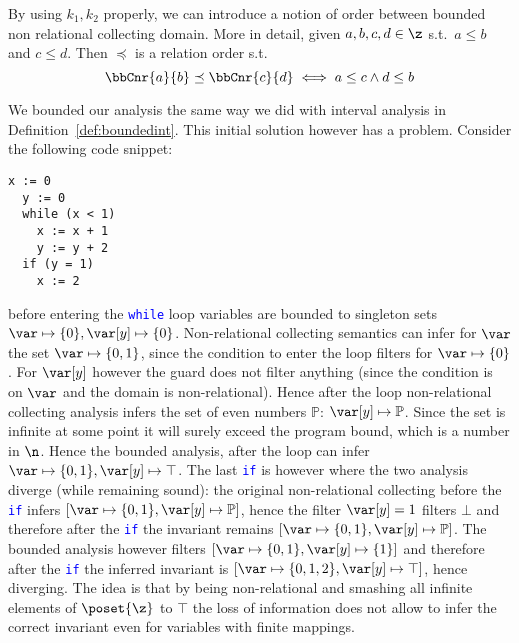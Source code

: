 By using \(k_1, k_2\) properly, we can introduce a notion of order
between bounded non relational collecting domain. More in detail,
given \(a,b,c,d \in \z\) s.t.\ \(a\leq b\) and \(c \leq d\). Then
\(\preceq\) is a relation order s.t.
\begin{equation*}
  \bbCnr{a}{b} \preceq \bbCnr{c}{d} \iff a \leq c \land d \leq b
\end{equation*}

We bounded our analysis the same way we did with interval analysis in
Definition~\ref{def:boundedint}. This initial solution however has a
problem. Consider the following code snippet:
\begin{lstlisting}[language=Imp,caption=Snippet where bounded analysis diverges from the unbounded counterpart, label=code3]
  x := 0
  y := 0
  while (x < 1)
    x := x + 1
    y := y + 2
  if (y = 1)
    x := 2
\end{lstlisting}
before entering the \textcolor{blue}{\texttt{while}} loop variables
are bounded to singleton sets
\(\var \mapsto \{0\}, \var[y] \mapsto \{0\}\). Non-relational
collecting semantics can infer for \(\var\) the set
\(\var\mapsto \{0,1\}\), since the condition to enter the loop filters
for \(\var \mapsto \{0\}\). For \(\var[y]\) however the guard does not
filter anything (since the condition is on \(\var\) and the domain is
non-relational). Hence after the loop non-relational collecting
analysis infers the set of even numbers \(\mathbb{P}\):
\(\var[y] \mapsto \mathbb{P}\). Since the set is infinite at some
point it will surely exceed the program bound, which is a number in
\(\n\). Hence the bounded analysis, after the loop can infer
\(\var\mapsto\{0,1\}, \var[y] \mapsto \top\). The last
\textcolor{blue}{\texttt{if}} is however where the two analysis
diverge (while remaining sound): the original non-relational
collecting before the \textcolor{blue}{\texttt{if}} infers
\([\var\mapsto\{0,1\}, \var[y]\mapsto\mathbb{P}]\), hence the filter
\(\var[y] = 1\) filters \(\bot\) and therefore after the
\textcolor{blue}{\texttt{if}} the invariant remains
\([\var\mapsto\{0,1\}, \var[y]\mapsto\mathbb{P}]\). The bounded
analysis however filters \([\var\mapsto\{0,1\}, \var[y]\mapsto\{1\}]\)
and therefore after the \textcolor{blue}{\texttt{if}} the inferred
invariant is \([\var\mapsto\{0,1,2\}, \var[y]\mapsto\top]\), hence
diverging. The idea is that by being non-relational and smashing all
infinite elements of \(\poset{\z}\) to \(\top\) the loss of
information does not allow to infer the correct invariant even for
variables with finite mappings.

